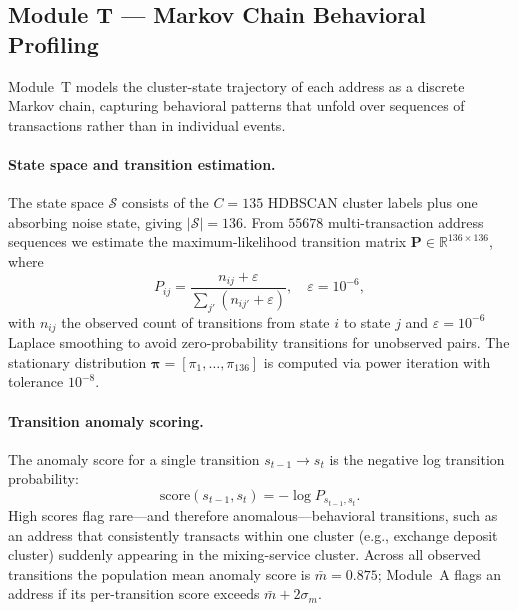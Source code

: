 \documentclass[journal]{IEEEtran}
\begin{document}
\subsection{Module T — Markov Chain Behavioral Profiling}
\label{sec:module_t}

Module~T models the cluster-state trajectory of each address as a discrete
Markov chain, capturing behavioral patterns that unfold over sequences of
transactions rather than in individual events.

\paragraph{State space and transition estimation.}
The state space $\mathcal{S}$ consists of the $C = 135$ HDBSCAN cluster
labels plus one absorbing noise state, giving $|\mathcal{S}| = 136$.
From $\num{55678}$ multi-transaction address sequences we estimate the
maximum-likelihood transition matrix
$\mathbf{P} \in \mathbb{R}^{136 \times 136}$, where
\begin{equation}
  P_{ij} = \frac{n_{ij} + \varepsilon}{\sum_{j'} (n_{ij'} + \varepsilon)},
  \quad \varepsilon = 10^{-6},
  \label{eq:markov_transition}
\end{equation}
with $n_{ij}$ the observed count of transitions from state $i$ to state $j$
and $\varepsilon = 10^{-6}$ Laplace smoothing to avoid zero-probability
transitions for unobserved pairs.
The stationary distribution $\boldsymbol{\pi} = [\pi_1, \ldots, \pi_{136}]$
is computed via power iteration with tolerance $10^{-8}$.

\paragraph{Transition anomaly scoring.}
The anomaly score for a single transition $s_{t-1} \to s_t$ is the negative
log transition probability:
\begin{equation}
  \mathrm{score}(s_{t-1}, s_t) = -\log P_{s_{t-1}, s_t}.
  \label{eq:markov_score}
\end{equation}
High scores flag rare—and therefore anomalous—behavioral transitions, such as
an address that consistently transacts within one cluster (e.g., exchange
deposit cluster) suddenly appearing in the mixing-service cluster.
Across all observed transitions the population mean anomaly score is
$\bar{m} = 0.875$; Module~A flags an address if its per-transition score
exceeds $\bar{m} + 2\sigma_m$.
\end{document}
